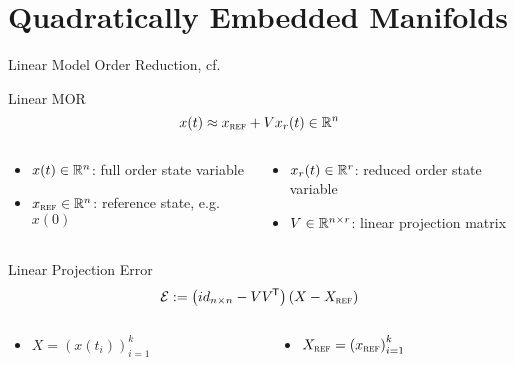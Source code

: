 \section{Quadratically Embedded Manifolds}

\begin{frame}{Linear Model Order Reduction, cf.~\cite{Geelen2023}}
    \begin{block}{Linear MOR}
        \begin{equation*}
            x(t) \approx x_{\textsc{ref}} + V x_r(t) \in \mathbb{R}^n
        \end{equation*}
    \end{block}

    \begin{columns}
        \begin{column}{.49\textwidth}
            \begin{itemize}
                \item $x(t) \in \mathbb{R}^n$: full order state variable
                \item $x_{\textsc{ref}} \in \mathbb{R}^n$: reference state, e.g.\ $x(0)$
            \end{itemize}
        \end{column}
        \begin{column}{.49\textwidth}
            \begin{itemize}
                \item $x_r(t) \in \mathbb{R}^r$: reduced order state variable
                \item $V \in \mathbb{R}^{n \times r}$: linear projection matrix
            \end{itemize}
        \end{column}
    \end{columns}

    \begin{block}{Linear Projection Error}
        \begin{equation*}
            \mathcal{E} := \left( id_{n \times n} - VV^{\mkern-1.5mu \mathsf{T}} \right) \left( X - X_{\textsc{ref}} \right)
        \end{equation*}
    \end{block}

    \begin{columns}
        \begin{column}{.25\textwidth}
	        \begin{itemize}
                \item $X = {\left( x(t_i) \right)}_{i = 1}^k$
            \end{itemize}
        \end{column}
        \begin{column}{.25\textwidth}
            \begin{itemize}
                \item $X_{\textsc{ref}} = {\left( x_{\textsc{ref}} \right)}_{i = 1}^k$
            \end{itemize}
        \end{column}
    \end{columns}

\end{frame}

